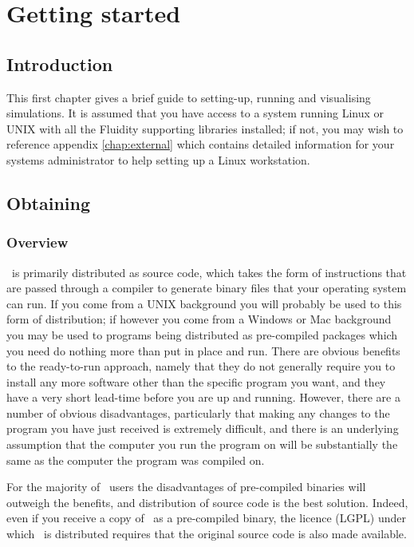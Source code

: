 \chapter{Getting started}\label{chap:gettingstarted}

\section{Introduction}
This first chapter gives a brief guide to setting-up, running and visualising
simulations. It is assumed that you have access to a system running Linux or
UNIX with all the Fluidity supporting libraries installed; if not, you may wish
to reference appendix \ref{chap:external} which contains detailed information
for your systems administrator to help setting up a Linux workstation. 

\section{Obtaining \fluidity}
\label{sect:obtaining_fluidity}

\subsection{Overview}
\label{sect:obtaining_fluidity_overview}

\fluidity\ is primarily distributed as source code, which takes the form of
instructions that are passed through a compiler to generate binary files that
your operating system can run. If you come from a UNIX background you will
probably be used to this form of distribution; if however you come from a
Windows or Mac background you may be used to programs being distributed as
pre-compiled packages which you need do nothing more than put in place and run.
There are obvious benefits to the ready-to-run approach, namely that they do
not generally require you to install any more software other than the specific
program you want, and they have a very short lead-time before you are up and
running. However, there are a number of obvious disadvantages, particularly that
making any changes to the program you have just received is extremely
difficult, and there is an underlying assumption that the computer you run the
program on will be substantially the same as the computer the program was
compiled on.

For the majority of \fluidity\ users the disadvantages of pre-compiled binaries
will outweigh the benefits, and distribution of source code is the best
solution. Indeed, even if you receive a copy of \fluidity\ as a pre-compiled
binary, the licence (LGPL) under which \fluidity\ is distributed requires that
the original source code is also made available.

